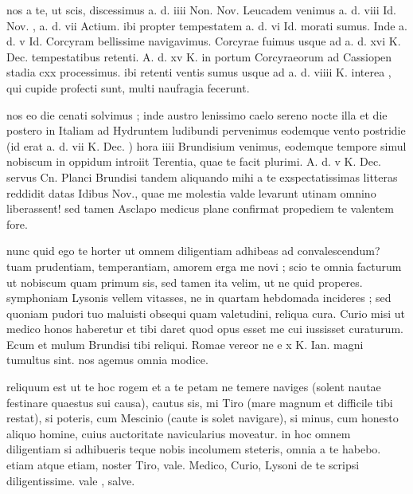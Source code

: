 


 nos a te, ut scis, discessimus a. d. iiii Non. Nov. Leucadem venimus a. d. viii Id. Nov. , a. d. vii Actium. ibi propter tempestatem a. d. vi Id. morati sumus. Inde a. d. v Id. Corcyram bellissime navigavimus. Corcyrae fuimus usque ad a. d. xvi K. Dec. tempestatibus retenti. A. d. xv K. in portum Corcyraeorum ad Cassiopen stadia cxx processimus. ibi retenti ventis sumus usque ad a. d. viiii K. interea , qui cupide profecti sunt, multi naufragia fecerunt.

 nos eo die cenati solvimus ; inde austro lenissimo caelo sereno nocte illa et die postero in Italiam ad Hydruntem ludibundi pervenimus eodemque vento postridie (id erat a. d. vii K. Dec. ) hora iiii Brundisium venimus, eodemque tempore simul nobiscum in oppidum introiit Terentia, quae te facit plurimi. A. d. v K. Dec. servus Cn. Planci Brundisi tandem aliquando mihi a te exspectatissimas litteras reddidit datas Idibus Nov., quae me molestia valde levarunt utinam omnino liberassent! sed tamen Asclapo medicus plane confirmat propediem te valentem fore.

 nunc quid ego te horter ut omnem diligentiam adhibeas ad convalescendum? tuam prudentiam, temperantiam, amorem erga me novi ; scio te omnia facturum ut nobiscum quam primum sis, sed tamen ita velim, ut ne quid properes. symphoniam Lysonis vellem vitasses, ne in quartam hebdomada incideres ; sed quoniam pudori tuo maluisti obsequi quam valetudini, reliqua cura. Curio misi ut medico honos haberetur et tibi daret quod opus esset me cui iussisset curaturum. Ecum et mulum Brundisi tibi reliqui. Romae vereor ne e x K. Ian. magni tumultus sint. nos agemus omnia modice.

 reliquum est ut te hoc rogem et a te petam ne temere naviges (solent nautae festinare quaestus sui causa), cautus sis, mi Tiro (mare magnum et difficile tibi restat), si poteris, cum Mescinio (caute is solet navigare), si minus, cum honesto aliquo homine, cuius auctoritate navicularius moveatur. in hoc omnem diligentiam si adhibueris teque nobis incolumem steteris, omnia a te habebo. etiam atque etiam, noster Tiro, vale. Medico, Curio, Lysoni de te scripsi diligentissime. vale , salve.
